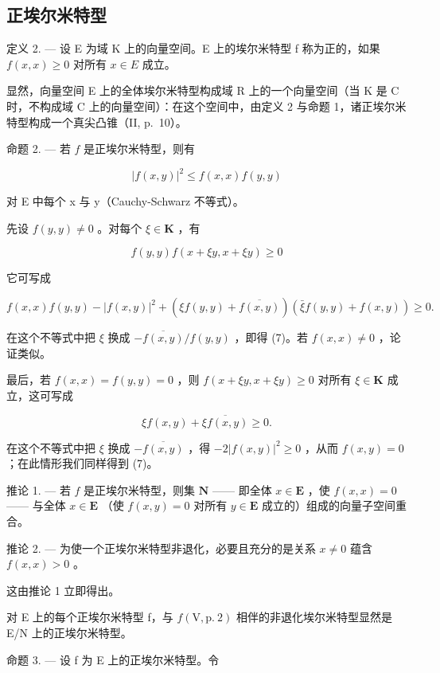 \subsection{正埃尔米特型}

定义 2. --- 设 E 为域 K 上的向量空间。E 上的埃尔米特型 f 称为正的，如果 \(f(x, x) \geqslant 0\) 对所有 \(x \in E\) 成立。

显然，向量空间 E 上的全体埃尔米特型构成域 R 上的一个向量空间（当 K 是 C 时，不构成域 C 上的向量空间）：在这个空间中，由定义 2 与命题 1，诸正埃尔米特型构成一个真尖凸锥（II, p.~10）。

命题 2. --- 若 \(f\) 是正埃尔米特型，则有

\[
\left| f (x, y) \right| ^ {2} \leqslant f (x, x) f (y, y)\tag{7}
\]

对 E 中每个 x 与 y（Cauchy-Schwarz 不等式）。

先设 \(f(y, y) \neq 0\) 。对每个 \(\xi \in \mathbf{K}\) ，有

\[
f (y, y) f (x + \xi y, x + \xi y) \geqslant 0
\]

它可写成

\[
f (x, x) f (y, y) - | f (x, y) | ^ {2} + (\xi f (y, y) + \overline {{f (x , y)}}) (\bar {\xi} f (y, y) + f (x, y)) \geqslant 0.
\]

在这个不等式中把 \(\xi\) 换成 \(-\overline{f(x,y)} / f(y,y)\) ，即得 (7)。若 \(f(x,x)\neq 0\) ，论证类似。

最后，若 \(f(x, x) = f(y, y) = 0\) ，则 \(f(x + \xi y, x + \xi y) \geqslant 0\) 对所有 \(\xi \in \mathbf{K}\) 成立，这可写成

\[
\xi f (x, y) + \overline {{{{\xi f (x , y)}}}} \geqslant 0.
\]

在这个不等式中把 \(\xi\) 换成 \(-\overline{f(x,y)}\) ，得 \(-2|f(x,y)|^2 \geqslant 0\) ，从而 \(f(x,y) = 0\) ；在此情形我们同样得到 (7)。

推论 1. --- 若 \(f\) 是正埃尔米特型，则集 \(\mathbf{N}\) —— 即全体 \(x \in \mathbf{E}\) ，使 \(f(x, x) = 0\) —— 与全体 \(x \in \mathbf{E}\) （使 \(f(x, y) = 0\) 对所有 \(y \in \mathbf{E}\) 成立的）组成的向量子空间重合。

推论 2. --- 为使一个正埃尔米特型非退化，必要且充分的是关系 \(x \neq 0\) 蕴含 \(f(x, x) > 0\) 。

这由推论 1 立即得出。

对 E 上的每个正埃尔米特型 f，与 \(f(\mathrm{V}, \mathrm{p.~2})\) 相伴的非退化埃尔米特型显然是 E/N 上的正埃尔米特型。

命题 3. --- 设 f 为 E 上的正埃尔米特型。令

